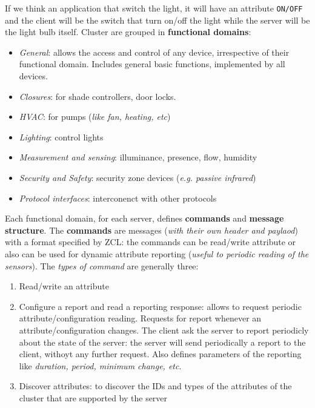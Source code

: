 \documentclass[10pt,a4paper]{report}
\theoremstyle{definition}
\begin{document}
If we think an application that switch the light, it will have an attribute \texttt{ON/OFF} and the client will be the switch that turn on/off the light while the server will be the light bulb itself.
Cluster are grouped in \textbf{functional domains}:
\begin{itemize}
	\item 
	\textit{General}: allows the access and control of any device, irrespective of their functional domain. Includes general basic functions, implemented by all devices.
	\item 
	\textit{Closures}:  for shade controllers, door locks.
	\item 
	\textit{HVAC}: for pumps (\textit{like fan, heating, etc})
	\item 
	\textit{Lighting}: control lights
	\item 
	\textit{Measurement and sensing}: illuminance, presence, flow, humidity
	\item 
	\textit{Security and Safety}: security zone devices (\textit{e.g. passive infrared})
	\item 
	\textit{Protocol interfaces}: interconenct with other protocols
	
\end{itemize}
Each functional domain, for each server, defines \textbf{commands} and \textbf{message structure}.
The \textbf{commands} are messages (\textit{with their own header and paylaod}) with a format specified by ZCL: the commands can be read/write attribute or also can be used for dynamic attribute reporting (\textit{useful to periodic reading of the sensors}).
The \textit{types of command} are generally three:

\begin{enumerate}
	\item 
	Read/write an attribute
	\item 
	Configure a report and read a reporting response:  allows to request periodic attribute/configuration reading. Requests for report whenever an attribute/configuration changes. The client ask the server to report periodicly about the state of the server: the server will send periodically a report to the client, withoyt any further request. Also defines parameters of the reporting like \textit{duration, period, minimum change, etc}.
	\item 
	Discover attributes: to discover the IDs and types of the attributes of the cluster that are supported by the server
\end{enumerate}
\end{document}
